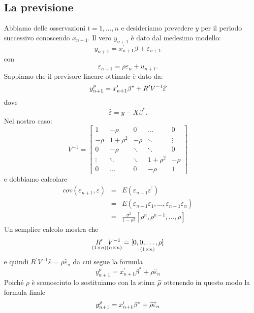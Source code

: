 \documentclass[a4paper]{report}
\theoremstyle{remark}
\begin{document}
\subsection{La previsione}

Abbiamo delle osservazioni $t=1,\ldots ,n$ e desideriamo prevedere $y$ per
il periodo successivo conoscendo $x_{n+1}$. Il vero $y_{n+1}$ \`{e} dato dal
medesimo modello:%
\begin{equation*}
y_{n+1}=x_{n+1}^{\prime }\beta +\varepsilon _{n+1}
\end{equation*}%
con 
\begin{equation*}
\varepsilon _{n+1}=\rho \varepsilon _{n}+u_{n+1}.
\end{equation*}%
Sappiamo che il previsore lineare ottimale \`{e} dato da:%
\begin{equation*}
y_{n+1}^{p}=x_{n+1}^{\prime }\beta ^{\ast }+R^{\prime }V^{-1}\widehat{%
\varepsilon }
\end{equation*}%
dove 
\begin{equation*}
\widehat{\varepsilon }=y-X\beta ^{\ast }.
\end{equation*}%
Nel nostro caso:%
\begin{equation*}
V^{-1}=\left[ 
\begin{array}{ccccc}
1 & -\rho & 0 & \dots & 0 \\ 
-\rho & 1+\rho ^{2} & -\rho & \ddots & \vdots \\ 
0 & -\rho & \ddots & \ddots & 0 \\ 
\vdots & \ddots & \ddots & 1+\rho ^{2} & -\rho \\ 
0 & \dots & 0 & -\rho & 1%
\end{array}%
\right]
\end{equation*}%
e dobbiamo calcolare 
\begin{eqnarray*}
cov(\varepsilon _{n+1},\varepsilon ) &=&E(\varepsilon _{n+1}\varepsilon
^{\prime }) \\
&=&E(\varepsilon _{n+1}\varepsilon _{1},\dots ,\varepsilon _{n+1}\varepsilon
_{n}) \\
&=&\frac{\sigma ^{2}}{1-\rho ^{2}}\left[ \rho ^{n},\rho ^{n-1},\dots ,\rho %
\right]
\end{eqnarray*}%
Un semplice calcolo mostra che 
\begin{equation*}
\underset{(1\times n)}{R^{\prime }}\underset{(n\times n)}{V^{-1}}=\underset{%
(1\times n)}{[0,0,\dots ,\rho ]}
\end{equation*}%
e quindi $R^{\prime }V^{-1}\widehat{\varepsilon }=\rho \widehat{\varepsilon }%
_{n}$ da cui segue la formula%
\begin{equation*}
y_{n+1}^{p}=x_{n+1}^{\prime }\beta ^{\ast }+\rho \widehat{\varepsilon }_{n}
\end{equation*}%
Poich\'{e} $\rho $ \`{e} sconosciuto lo sostituiamo con la stima $\widehat{%
\rho }$ ottenendo in questo modo la formula finale%
\begin{equation*}
y_{n+1}^{p}=x_{n+1}^{\prime }\beta ^{\ast }+\widehat{\rho }\widehat{%
\varepsilon }_{n}
\end{equation*}
\end{document}
